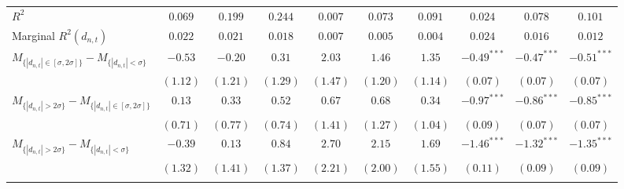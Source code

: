\begin{tabular}{lccccccccc}
  $R^2$ & $0.069$ & $0.199$ & $0.244$ & $0.007$ & $0.073$ & $0.091$ & $0.024$ & $0.078$ & $0.101$ \\ 
  Marginal $R^2(d_{n,t})$ & $0.022$ & $0.021$ & $0.018$ & $0.007$ & $0.005$ & $0.004$ & $0.024$ & $0.016$ & $0.012$ \\ 
 \hline
  $M_{\{|d_{n,t}| \in [\sigma, 2\sigma]\}} - M_{\{|d_{n,t}| < \sigma\}}$ & $-0.53$ & $-0.20$ & $0.31$ & $2.03$ & $1.46$ & $1.35$ & $-0.49^{***}$ & $-0.47^{***}$ & $-0.51^{***}$ \\ 
   & $(1.12)$ & $(1.21)$ & $(1.29)$ & $(1.47)$ & $(1.20)$ & $(1.14)$ & $(0.07)$ & $(0.07)$ & $(0.07)$ \\ 
  $M_{\{|d_{n,t}| > 2 \sigma\}} - M_{\{|d_{n,t}| \in [\sigma, 2\sigma]\}}$ & $0.13$ & $0.33$ & $0.52$ & $0.67$ & $0.68$ & $0.34$ & $-0.97^{***}$ & $-0.86^{***}$ & $-0.85^{***}$ \\ 
   & $(0.71)$ & $(0.77)$ & $(0.74)$ & $(1.41)$ & $(1.27)$ & $(1.04)$ & $(0.09)$ & $(0.07)$ & $(0.07)$ \\ 
  $M_{\{|d_{n,t}| > 2 \sigma\}} - M_{\{|d_{n,t}| < \sigma\}}$ & $-0.39$ & $0.13$ & $0.84$ & $2.70$ & $2.15$ & $1.69$ & $-1.46^{***}$ & $-1.32^{***}$ & $-1.35^{***}$ \\ 
   & $(1.32)$ & $(1.41)$ & $(1.37)$ & $(2.21)$ & $(2.00)$ & $(1.55)$ & $(0.11)$ & $(0.09)$ & $(0.09)$ \\ \vspace{5pt} 
   \hline 
\end{tabular}

